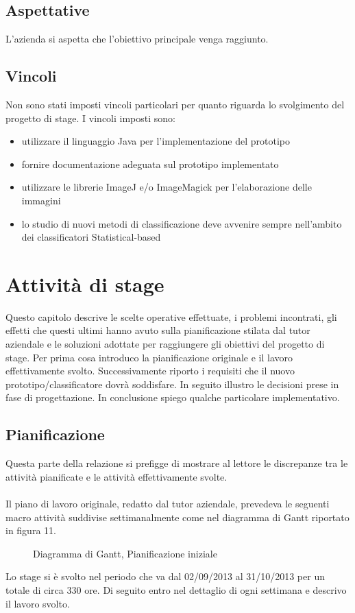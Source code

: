 \subsection{Aspettative}
\label{2.3}
L'azienda si aspetta che l'obiettivo principale venga raggiunto.
\subsection{Vincoli}
\label{2.4}
Non sono stati imposti vincoli particolari per quanto riguarda lo svolgimento del progetto di stage. I vincoli imposti sono:
\begin{itemize}
\item utilizzare il linguaggio Java per l'implementazione del prototipo
\item fornire documentazione adeguata sul prototipo implementato
\item utilizzare le librerie ImageJ e/o ImageMagick per l'elaborazione delle immagini
\item lo studio di nuovi metodi di classificazione deve avvenire sempre nell'ambito dei classificatori Statistical-based
\end{itemize}

\newpage

\section{Attività di stage}
\label{3.0}
Questo capitolo descrive le scelte operative effettuate, i problemi incontrati, gli effetti che questi ultimi hanno avuto sulla pianificazione stilata dal tutor aziendale e le soluzioni adottate per raggiungere gli obiettivi del progetto di stage. Per prima cosa introduco la pianificazione originale e il lavoro effettivamente svolto. Successivamente riporto i requisiti che il nuovo prototipo/classificatore dovrà soddisfare. In seguito illustro le decisioni prese in fase di progettazione. In conclusione spiego qualche particolare implementativo.
\subsection{Pianificazione}
\label{3.1}
Questa parte della relazione si prefigge di mostrare al lettore le discrepanze tra le attività pianificate e le attività effettivamente svolte.\\\\
Il piano di lavoro originale, redatto dal tutor aziendale, prevedeva le seguenti macro attività suddivise settimanalmente come nel diagramma di Gantt riportato in figura 11.
\begin{figure}[H]
\centering
\noindent{}
\caption{Diagramma di Gantt, Pianificazione iniziale}
\end{figure}
Lo stage si è svolto nel periodo che va dal 02/09/2013 al 31/10/2013 per un totale di circa 330 ore.
Di seguito entro nel dettaglio di ogni settimana e descrivo il lavoro svolto.
